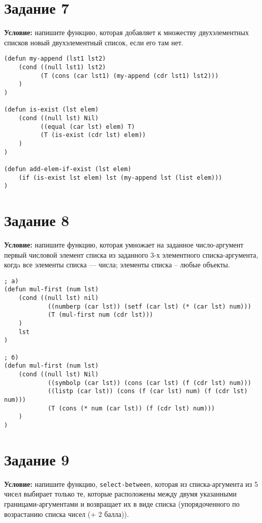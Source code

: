 \section{Задание 7}

\textbf{Условие:} напишите функцию, которая добавляет к множеству двухэлементных списков новый двухэлементный список, если его там нет.

\begin{lstlisting}
(defun my-append (lst1 lst2)
    (cond ((null lst1) lst2)
          (T (cons (car lst1) (my-append (cdr lst1) lst2)))
    )
)

(defun is-exist (lst elem)
    (cond ((null lst) Nil)
          ((equal (car lst) elem) T)
          (T (is-exist (cdr lst) elem))
    )
)

(defun add-elem-if-exist (lst elem)
    (if (is-exist lst elem) lst (my-append lst (list elem)))
)
\end{lstlisting}


\section{Задание 8}

\textbf{Условие:} напишите функцию, которая умножает на заданное число-аргумент первый числовой элемент списка из заданного 3-х элементного списка-аргумента, когдa все элементы списка --- числа; элементы списка -- любые объекты.


\begin{lstlisting}
; a)
(defun mul-first (num lst)
    (cond ((null lst) nil)
            ((numberp (car lst)) (setf (car lst) (* (car lst) num)))
            (T (mul-first num (cdr lst)))
    )
    lst
)

; б)
(defun mul-first (num lst)
    (cond ((null lst) Nil)
            ((symbolp (car lst)) (cons (car lst) (f (cdr lst) num)))
            ((listp (car lst)) (cons (f (car lst) num) (f (cdr lst) num)))
            (T (cons (* num (car lst)) (f (cdr lst) num))) 
    )
)
\end{lstlisting}


\section{Задание 9}

\textbf{Условие:} напишите функцию, \texttt{select-between}, которая из списка-аргумента из 5 чисел выбирает только те, которые расположены между двумя указанными границами-аргументами и возвращает их в виде списка (упорядоченного по возрастанию списка чисел (+ 2 балла)).

